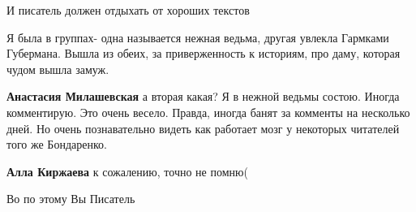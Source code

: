 \begin{itemize}
 
И писатель должен отдыхать от хороших текстов

 

Я была в группах- одна называется нежная ведьма, другая увлекла Гармками
Губермана. Вышла из обеих, за приверженность к историям, про даму, которая
чудом вышла замуж.

\begin{itemize}
 
\textbf{Анастасия Милашевская} а вторая какая?
Я в нежной ведьмы состою.
Иногда комментирую. Это очень весело.
Правда, иногда банят за комменты на несколько дней.
Но очень познавательно видеть как работает мозг у некоторых читателей того же Бондаренко.

 
\textbf{Алла Киржаева} к сожалению, точно не помню(
\end{itemize}

 
Во по этому Вы Писатель

 

\end{itemize}
